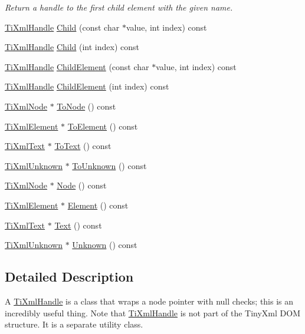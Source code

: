 \begin{DoxyCompactItemize}
\begin{DoxyCompactList}\small\item\em Return a handle to the first child element with the given name. \end{DoxyCompactList}\item 
\hyperlink{classTiXmlHandle}{Ti\+Xml\+Handle} \hyperlink{classTiXmlHandle_a072492b4be1acdb0db2d03cd8f71ccc4}{Child} (const char $\ast$value, int index) const 
\item 
\hyperlink{classTiXmlHandle}{Ti\+Xml\+Handle} \hyperlink{classTiXmlHandle_af9cf6a7d08a5da94a8924425ad0cd5ac}{Child} (int index) const 
\item 
\hyperlink{classTiXmlHandle}{Ti\+Xml\+Handle} \hyperlink{classTiXmlHandle_a979a3f850984a176ee884e394c7eed2d}{Child\+Element} (const char $\ast$value, int index) const 
\item 
\hyperlink{classTiXmlHandle}{Ti\+Xml\+Handle} \hyperlink{classTiXmlHandle_a8786475b9d1f1518492e3a46704c7ef0}{Child\+Element} (int index) const 
\item 
\hyperlink{classTiXmlNode}{Ti\+Xml\+Node} $\ast$ \hyperlink{classTiXmlHandle_af678e5088e83be67baf76f699756f2c3}{To\+Node} () const 
\item 
\hyperlink{classTiXmlElement}{Ti\+Xml\+Element} $\ast$ \hyperlink{classTiXmlHandle_abc6e7ed383a5fe1e52b0c0004b457b9e}{To\+Element} () const 
\item 
\hyperlink{classTiXmlText}{Ti\+Xml\+Text} $\ast$ \hyperlink{classTiXmlHandle_a4ac53a652296203a5b5e13854d923586}{To\+Text} () const 
\item 
\hyperlink{classTiXmlUnknown}{Ti\+Xml\+Unknown} $\ast$ \hyperlink{classTiXmlHandle_a1381c17507a130767b1e23afc93b3674}{To\+Unknown} () const 
\item 
\hyperlink{classTiXmlNode}{Ti\+Xml\+Node} $\ast$ \hyperlink{classTiXmlHandle_ab44b723a8dc9af72838a303c079d0376}{Node} () const 
\item 
\hyperlink{classTiXmlElement}{Ti\+Xml\+Element} $\ast$ \hyperlink{classTiXmlHandle_acb5fe8388a526289ea65e817a51e05e7}{Element} () const 
\item 
\hyperlink{classTiXmlText}{Ti\+Xml\+Text} $\ast$ \hyperlink{classTiXmlHandle_a9fc739c8a18d160006f82572fc143d13}{Text} () const 
\item 
\hyperlink{classTiXmlUnknown}{Ti\+Xml\+Unknown} $\ast$ \hyperlink{classTiXmlHandle_a49675b74357ba2aae124657a9a1ef465}{Unknown} () const 
\end{DoxyCompactItemize}


\subsection{Detailed Description}
A \hyperlink{classTiXmlHandle}{Ti\+Xml\+Handle} is a class that wraps a node pointer with null checks; this is an incredibly useful thing. Note that \hyperlink{classTiXmlHandle}{Ti\+Xml\+Handle} is not part of the Tiny\+Xml D\+OM structure. It is a separate utility class.

